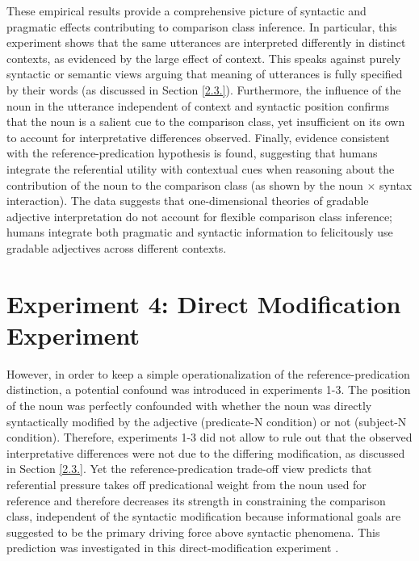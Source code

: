 These empirical results provide a comprehensive picture of syntactic and pragmatic effects contributing to comparison class inference. In particular, this experiment shows that the same utterances are interpreted differently in distinct contexts, as evidenced by the large effect of context. This speaks against purely syntactic or semantic views arguing that meaning of utterances is fully specified by their words (as discussed in Section \ref{2.3.}). Furthermore, the influence of the noun in the utterance independent of context and syntactic position confirms that the noun is a salient cue to the comparison class, yet insufficient on its own to account for interpretative differences observed. Finally, evidence consistent with the reference-predication hypothesis is found, suggesting that humans integrate the referential utility with contextual cues when reasoning about the contribution of the noun to the comparison class (as shown by the noun $\times$ syntax interaction). The data suggests that one-dimensional theories of gradable adjective interpretation do not account for flexible comparison class inference; humans integrate both pragmatic and syntactic information to felicitously use gradable adjectives across different contexts. 

\section{Experiment 4: Direct Modification Experiment} 
However, in order to keep a simple operationalization of the reference-predication distinction, a potential confound was introduced in experiments 1-3. The position of the noun was perfectly confounded with whether the noun was directly syntactically modified by the adjective (predicate-N condition) or not (subject-N condition). Therefore, experiments 1-3 did not allow to rule out that the observed interpretative differences were not due to the differing modification, as discussed in Section \ref{2.3.}.  Yet the reference-predication trade-off view predicts that referential pressure takes off predicational weight from the noun used for reference and therefore decreases its strength in constraining the comparison class, independent of the syntactic modification because informational goals are suggested to be the primary driving force above syntactic phenomena. This prediction was investigated in this direct-modification experiment \parencite{TesslerEtAl2020AMLaP}.

